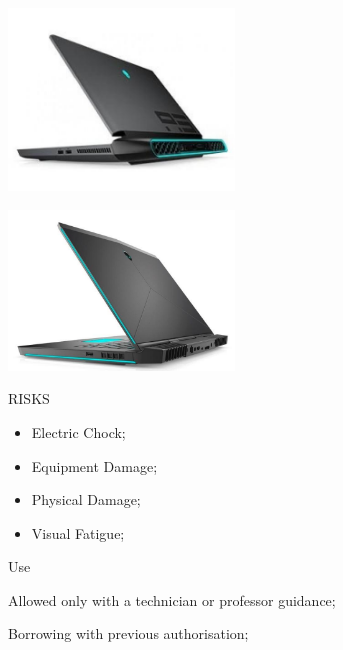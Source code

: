 \begin{multicols}{2}

\includegraphics[width=60mm, keepaspectratio]{imgs/image4.jpg}

\includegraphics[width=60mm, keepaspectratio]{imgs/image5.jpg}

\columnbreak

\begin{mdframed}[roundcorner=10pt, linecolor=red, linewidth=2pt]
\vspace{1em}
{\Large {\color{red}RISKS}}
\vspace{1em}

\begin{itemize}
    \item Electric Chock;
    \item Equipment Damage;
    \item Physical Damage;
    \item Visual Fatigue; 
\end{itemize}

\vspace{1em}
\end{mdframed}

\vspace{2em}

{\Large Use}
\vspace{1em}

Allowed only with a technician or professor guidance;

Borrowing with previous authorisation; 

\end{multicols}

